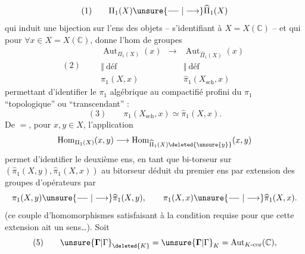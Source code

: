 \[
(1)\qquad\Pi_1(X)\unsure{\relbar\joinrel\relbar|\longrightarrow}\widehat\Pi_1(X)
\]
qui induit une bijection sur l'ens des objets  -- s'identifiant à $X=X(\mathbb C)$ -- et qui  pour $\forall x\in X=X(\mathbb C)$, donne l'hom de groupes
\[
(2)\qquad
\begin{array}{ccc}
\operatorname{Aut}_{\Pi_1(X)}(x)&\longrightarrow&\operatorname{Aut}_{\widehat\Pi_1(X)}(x)\\
\Vert\ \text{déf}&&\Vert\ \text{déf}\\
\pi_1(X,x)&&\widehat\pi_1(X_{\mathrm{sch}},x)
\end{array}
\]
permettant d'identifier le $\pi_1$ algébrique au compactifié profini du $\pi_1$ ``topologique'' ou ``transcendant'' : 
\[
(3)\qquad\pi_1(X_{\mathrm{sch}},x)\simeq\widehat\pi_1(X,x).
\]
De $=$, pour $x,y\in X$, l'application
\[
\operatorname{Hom}_{\Pi_1(X)}(x,y)\longrightarrow\operatorname{Hom}_{\widehat\Pi_1(X)\deleted{\unsure{y}}}(x,y)
\]
permet d'identifier le deuxième ens, en tant que bi-torseur sur $(\widehat\pi_1(X,y),\widehat\pi_1(X,x))$ au bitorseur déduit  du premier ens par extension des groupes d'opérateurs par
\[
\pi_1(X,y)\unsure{\relbar\joinrel\relbar|\longrightarrow}\widehat\pi_1(X,y),\qquad\pi_1(X,x)\unsure{\relbar\joinrel\relbar|\longrightarrow}\widehat\pi_1(X,x).
\]
(ce couple d'homomorphismes satisfaisant  à la condition requise pour que cette extension ait un sens\ldots).
Soit
\[
(5)\qquad\unsure{\mathbf{\Gamma}|\Gamma}_{\deleted{K}}=\unsure{\mathbf{\Gamma}|\Gamma}_K=\operatorname{Aut}_{K\text{-cor}}(\mathbb C),
\]
